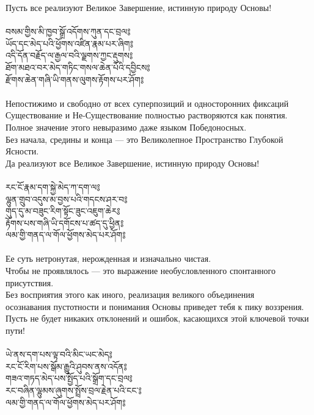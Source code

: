 Пусть все реализуют Великое Завершение, истинную природу Основы!\\
\\
{\ti བསམ་གྱིས་མི་ཁྱབ་སྒྲོ་འདོགས་ཀུན་དང་བྲལ༔\\
ཡོད་དང་མེད་པའི་ཕྱོགས་འཛིན་རྣམ་པར་ཞིག༔\\
འདི་དོན་བརྗོད་ལ་རྒྱལ་བའི་ལྗགས་ཀྱང་རྡུགས༔\\
ཐོག་མཐའ་བར་མེད་གཏིང་གསལ་ཆེན་པོའི་དབྱིངས༔\\
རྫོགས་ཆེན་གཞི་ཡི་གནས་ལུགས་རྟོགས་པར་ཤོག༔}\\
\\
\ru
Непостижимо и свободно от всех суперпозиций и односторонних фиксаций\\
Существование и Не-Существование полностью растворяются как понятия.\\
Полное значение этого невыразимо даже языком Победоносных.\\
Без начала, средины и конца — это Великолепное Пространство Глубокой Ясности.\\
Да реализуют все Великое Завершение, истинную природу Основы!\\
\\
\newpage
{\ti རང་ངོ་རྣམ་དག་སྐྱེ་མེད་ཀ་དག་ལ༔\\
ལྷུན་གྲུབ་འདུས་མ་བྱས་པའི་གདངས་ཤར་བ༔\\
གུད་དུ་མ་བཟུང་རིག་སྟོང་ཟུང་འཇུག་ཆེར༔\\
རྟོགས་པས་གཞི་ཡི་དགོངས་པ་ཚད་དུ་ཕྱིན༔\\
ལམ་གྱི་གནད་ལ་གོལ་ཕྱོགས་མེད་པར་ཤོག༔}\\
\\
\ru
Ее суть нетронутая, нерожденная и изначально чистая.\\
Чтобы не проявлялось — это выражение необусловленного спонтанного присутствия.\\
Без восприятия этого как иного, реализация великого объединения\\
осознавания пустотности и понимания Основы приведет тебя к пику воззрения.\\
Пусть не будет никаких отклонений и ошибок, касающихся этой ключевой точки пути!\\
\\
{\ti ཡེ་ནས་དག་པས་ལྟ་བའི་མིང་ཡང་མེད༔\\
རང་ངོ་རིག་པས་སྒོམ་རྒྱུའི་ཤུབས་ནས་འདོན༔\\
གཟའ་གཏད་མེད་པས་སྤྱོད་པའི་སྒྲོག་དང་བྲལ༔\\
རང་བཞིན་ལྷུམས་ཞུགས་སྤྲོས་བྲལ་རྗེན་པའི་ངང༌༔\\
ལམ་གྱི་གནད་ལ་གོལ་ཕྱོགས་མེད་པར་ཤོག༔}\\
